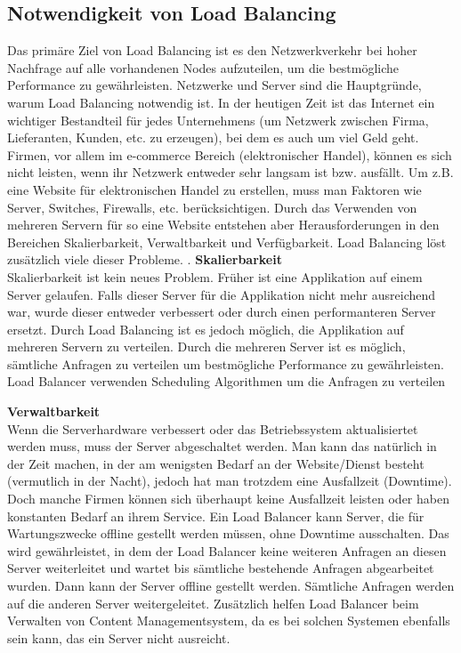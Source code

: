\pagebreak
\subsection{Notwendigkeit von Load Balancing}
\label{sec:Notwendigkeit von Load Balancing}
Das primäre Ziel von Load Balancing ist es den Netzwerkverkehr bei hoher Nachfrage auf alle vorhandenen Nodes aufzuteilen, um die bestmögliche Performance zu gewährleisten. Netzwerke und Server sind die Hauptgründe, warum Load Balancing notwendig ist. In der heutigen Zeit ist das Internet ein wichtiger Bestandteil für jedes Unternehmens (um Netzwerk zwischen Firma, Lieferanten, Kunden, etc. zu erzeugen), bei dem es auch um viel Geld geht. Firmen, vor allem im e-commerce Bereich (elektronischer Handel), können es sich nicht leisten, wenn ihr Netzwerk entweder sehr langsam ist bzw. ausfällt. 
Um z.B. eine Website für elektronischen Handel zu erstellen, muss man Faktoren wie Server, Switches, Firewalls, etc. berücksichtigen. Durch das Verwenden von mehreren Servern für so eine Website entstehen aber Herausforderungen in den Bereichen Skalierbarkeit, Verwaltbarkeit und Verfügbarkeit. Load Balancing löst zusätzlich viele dieser Probleme.
.\vspace{5mm}
\textbf{Skalierbarkeit} \\

Skalierbarkeit ist kein neues Problem. Früher ist eine Applikation auf einem Server gelaufen. Falls dieser Server für die Applikation nicht mehr ausreichend war, wurde dieser entweder verbessert oder durch einen performanteren Server ersetzt. Durch Load Balancing ist es jedoch möglich, die Applikation auf mehreren Servern zu verteilen. Durch die mehreren Server ist es möglich, sämtliche Anfragen zu verteilen um bestmögliche Performance zu gewährleisten. Load Balancer verwenden Scheduling Algorithmen um die Anfragen zu verteilen\vspace{5mm}

\textbf{Verwaltbarkeit} \\

Wenn die Serverhardware verbessert oder das Betriebssystem aktualisiertet werden muss, muss der Server abgeschaltet werden. Man kann das natürlich in der Zeit machen, in der am wenigsten Bedarf an der Website/Dienst besteht (vermutlich in der Nacht), jedoch hat man trotzdem eine Ausfallzeit (Downtime). Doch manche Firmen können sich überhaupt keine Ausfallzeit leisten oder haben konstanten Bedarf  an ihrem Service. Ein Load Balancer kann Server, die für Wartungszwecke offline gestellt werden müssen, ohne Downtime ausschalten. Das wird gewährleistet, in dem der Load Balancer keine weiteren Anfragen an diesen Server weiterleitet und wartet bis sämtliche bestehende Anfragen abgearbeitet wurden. Dann kann der Server offline gestellt werden. Sämtliche Anfragen werden auf die anderen Server weitergeleitet. Zusätzlich helfen Load Balancer beim Verwalten von Content Managementsystem, da es bei solchen Systemen ebenfalls sein kann, das ein Server nicht ausreicht.\vspace{5mm}   


